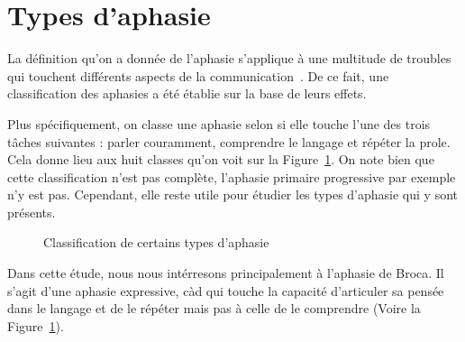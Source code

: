 \section{Types d'aphasie}

La définition qu'on a donnée de l'aphasie s'applique à une multitude de troubles  
qui touchent différents aspects de la communication~\cite[p. 135, 136]{Hallowell_2017}.
De ce fait, une classification des aphasies a été établie sur la base de leurs effets.

Plus spécifiquement, on classe une aphasie selon si elle touche l'une des trois tâches suivantes :
parler couramment, comprendre le langage et répéter la prole. 
Cela donne lieu aux huit classes qu'on voit sur la Figure~\ref{fig:aphasia-tree}.
On note  bien que cette classification n'est pas complète, l'aphasie primaire progressive par exemple n'y est pas.
Cependant, elle reste utile pour étudier les types d'aphasie qui y sont présents.


\begin{figure}[h]
    \begin{center}
        \resizebox{\textwidth}{!}{}
    \end{center}
    \caption[Classification de certains types d'aphasie]
    {Classification de certains types d'aphasie~\cite{Sreedharan_2018}}
    \label{fig:aphasia-tree}
\end{figure}

Dans cette étude, nous nous intérresons principalement à l'aphasie de Broca.
Il s'agit d'une aphasie expressive, 
càd qui touche la capacité d'articuler sa pensée dans le langage et de le répéter 
mais pas à celle de le comprendre (Voire la Figure~\ref{fig:aphasia-tree}).
